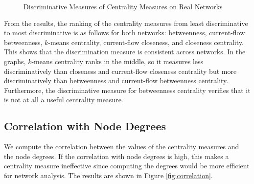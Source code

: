 \documentclass[10pt]{siamltex}
\begin{document}
\begin{pagewiselinenumbers}
\begin{figure}[h!!!]
\centering
{}
\caption{Discriminative Measures of Centrality Measures on Real Networks}
\label{fig:discriminative}
\end{figure}
 
From the results, the ranking of the centrality measures from least discriminative to most discriminative is as follows for both networks: betweenness, current-flow betweenness, $k$-means centrality, current-flow closeness, and closeness centrality.  This shows that the discrimination measure is consistent across networks. In the graphs, $k$-means centrality ranks in the middle, so it measures less discriminatively than closeness and current-flow closeness centrality but more discriminatively than betweenness and current-flow betweenness centrality. Furthermore, the discriminative measure for betweenness centrality verifies that it is not at all a useful centrality measure.

\subsection{Correlation with Node Degrees}
We compute the correlation between the values of the centrality measures and the node degrees. If the correlation with node degrees is high, this makes a centrality measure ineffective since computing the degrees would be more efficient for network analysis. The results are shown in Figure \ref{fig:correlation}. 


\end{pagewiselinenumbers}
\end{document}
